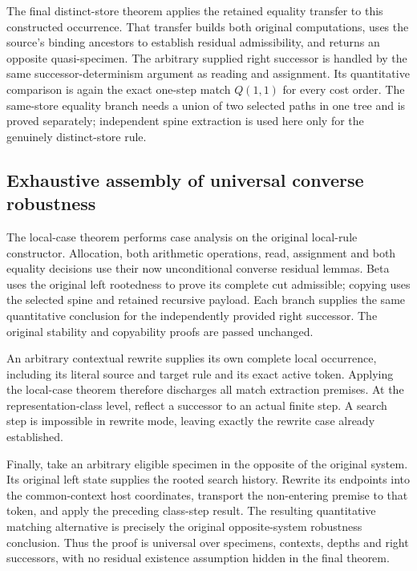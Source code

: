 The final distinct-store theorem applies the retained equality transfer to
this constructed occurrence. That transfer builds both original computations,
uses the source's binding ancestors to establish residual admissibility, and
returns an opposite quasi-specimen. The arbitrary supplied right successor
is handled by the same successor-determinism argument as reading and
assignment. Its quantitative comparison is again the exact one-step match
$Q(1,1)$ for every cost order. The same-store equality branch needs a union of
two selected paths in one tree and is proved separately; independent spine
extraction is used here only for the genuinely distinct-store rule.

\subsection{Exhaustive assembly of universal converse robustness}
The local-case theorem performs case analysis on the original local-rule
constructor. Allocation, both arithmetic operations, read, assignment and
both equality decisions use their now unconditional converse residual
lemmas. Beta uses the original left rootedness to prove its complete cut
admissible; copying uses the selected spine and retained recursive payload.
Each branch supplies the same quantitative conclusion for the independently
provided right successor. The original stability and copyability proofs
are passed unchanged.

An arbitrary contextual rewrite supplies its own complete local occurrence,
including its literal source and target rule and its exact active token.
Applying the local-case theorem therefore discharges all match extraction
premises. At the representation-class level, reflect a successor to an actual
finite step. A search step is impossible in rewrite mode, leaving exactly the
rewrite case already established.

Finally, take an arbitrary eligible specimen in the opposite of the original
system. Its original left state supplies the rooted search history. Rewrite
its endpoints into the common-context host coordinates, transport the
non-entering premise to that token, and apply the preceding class-step
result. The resulting quantitative matching alternative is precisely the
original opposite-system robustness conclusion. Thus the proof is universal
over specimens, contexts, depths and right successors, with no residual
existence assumption hidden in the final theorem.
